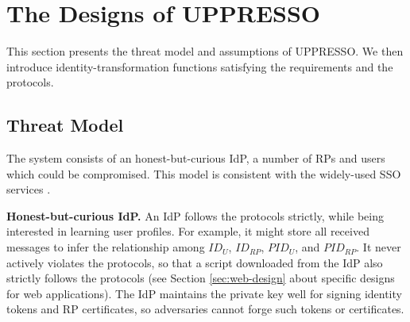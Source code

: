 
\section{The Designs of UPPRESSO}
\label{sec:UPPRESSO}

This section presents the threat model and assumptions of UPPRESSO.
We then introduce identity-transformation functions satisfying the requirements
    and the protocols.


\subsection{Threat Model}
The system consists of an honest-but-curious IdP, a number of RPs and users which could be compromised. %
This model is consistent with the widely-used SSO services \cite{OpenIDConnect,rfc6749,SAML,SAMLIdentifier,NIST2017draft}.


\noindent \textbf{Honest-but-curious IdP.}
An IdP follows the protocols strictly, while being interested in learning user profiles.
For example, it might store all received messages
 to infer the relationship among $ID_U$, $ID_{RP}$, $PID_{U}$, and $PID_{RP}$.
It never actively violates the protocols,
so that a script downloaded from the IdP also strictly follows the protocols (see Section \ref{sec:web-design} about specific designs 
    for web applications).
The IdP maintains the private key well for signing identity tokens and RP certificates, %
so adversaries cannot forge such tokens or certificates.



